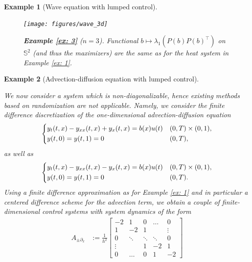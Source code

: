 \documentclass[journal,twoside,web]{ieeecolor}
\newcommand{\del}{\partial}
\newtheorem{example}{Example}
\begin{document}
\begin{example}[Wave equation with lumped control]
	\begin{figure}
	\begin{center}
	\texttt{[image: figures/wave\_3d]}	
	\end{center}
	\caption{\textbf{Example \ref{ex: 3}} ($n=3$). Functional $b\mapsto \lambda_1(P(b)P(b)^\top)$ on $\mathbb{S}^2$ (and thus the maximizers) are the same as for the heat system in Example \ref{ex: 1}.}
	  \label{fig: ex3.2}
	\end{figure}
	
	\end{example}
	\medskip
	
	
	\begin{example}[Advection-diffusion equation with lumped control] \label{ex: 2}
	
	We now consider a system which is non-diagonalizable, hence existing methods based on randomization are not applicable.
 Namely, we consider the finite difference discretization of the one-dimensional advection-diffusion equation
	\begin{equation*}
	\begin{dcases}
	y_t(t,x) - y_{xx}(t,x) + y_x(t,x) = b(x) u(t) &(0,T)\times (0,1),\\
	y(t,0) = y(t,1) = 0 &(0,T),\\
	\end{dcases}
	\end{equation*}
	as well as
	\begin{equation*}
	\begin{dcases}
	y_t(t,x) - y_{xx}(t,x) - y_x(t,x) = b(x) u(t) &(0,T)\times (0,1),\\
	y(t,0) = y(t,1) = 0 &(0,T).\\
	\end{dcases}
	\end{equation*}
	Using a finite difference approximation as for Example \ref{ex: 1} and in particular a centered difference scheme for the advection term, we obtain a couple of finite-dimensional control systems with system dynamics of the form
	\begin{align*}
	A_{\pm\del_x} &:= \frac{1}{h^2}
	\begin{bmatrix} 
           -2& 1& 0& \ldots& 0 \\ 
           1& -2& 1& & \vdots \\
           0& \ddots &\ddots& \ddots& 0 \\
           \vdots& & 1 & -2 & 1 \\
           0& \hdots &0 &1 & -2 
    \end{bmatrix} 

\end{align*}
\end{example}
\end{document}
